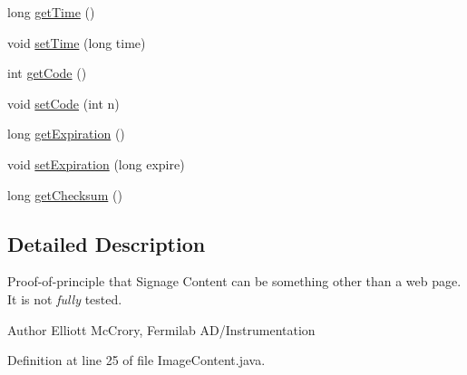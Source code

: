 \begin{DoxyCompactItemize}
long \hyperlink{classgov_1_1fnal_1_1ppd_1_1ZZattic_1_1ImageContent_a0275666a82661b15d9b17f6a116a48eb}{get\-Time} ()
\item 
void \hyperlink{classgov_1_1fnal_1_1ppd_1_1ZZattic_1_1ImageContent_a127548cb0dc1ceb8d9885510a223f070}{set\-Time} (long time)
\item 
int \hyperlink{classgov_1_1fnal_1_1ppd_1_1ZZattic_1_1ImageContent_a23e95423093af64abec0b08e239cabdf}{get\-Code} ()
\item 
void \hyperlink{classgov_1_1fnal_1_1ppd_1_1ZZattic_1_1ImageContent_ab2dbd0bb6c60d8e40b1f1a9a7d5465f8}{set\-Code} (int n)
\item 
long \hyperlink{classgov_1_1fnal_1_1ppd_1_1ZZattic_1_1ImageContent_af6dcb0d9e3d10e6463c2a8b3578dfefe}{get\-Expiration} ()
\item 
void \hyperlink{classgov_1_1fnal_1_1ppd_1_1ZZattic_1_1ImageContent_ae9ca8a2cfaab1eaf21c2784e4f548c47}{set\-Expiration} (long expire)
\item 
long \hyperlink{classgov_1_1fnal_1_1ppd_1_1ZZattic_1_1ImageContent_aa3036509e0eecf5806d2ce35196d2bf3}{get\-Checksum} ()
\end{DoxyCompactItemize}


\subsection{Detailed Description}
Proof-\/of-\/principle that Signage Content can be something other than a web page. It is not {\itshape fully} tested.

\begin{DoxyAuthor}{Author}
Elliott Mc\-Crory, Fermilab A\-D/\-Instrumentation 
\end{DoxyAuthor}


Definition at line 25 of file Image\-Content.\-java.



